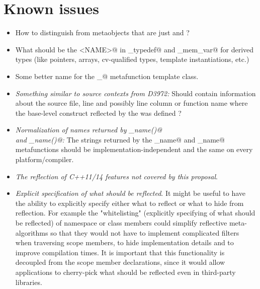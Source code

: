 \section{Known issues}

\begin{itemize}
\item How to distinguish  from metaobjects that
are just  and  ?

\item What should be the \verb@<NAME>@ in \verb@named_typedef@ and
\verb@named_mem_var@ for derived types (like pointers, arrays, cv-qualified types,
template instantiations, etc.)

\item Some better name for the \verb@template_@ metafunction template class.

\item {\em Something similar to source contexts from D3972:}
Should  contain information about the source file,
line and possibly line column or function name where the base-level construct
reflected by the  was defined ?

\item {\em Normalization of names returned by \verb@MetaNamed@ \verb@base_name()@\\
and \verb@MetaNamedScoped@ \verb@full_name()@:}
The strings returned by the \verb@base_name@ and \verb@full_name@ metafunctions
should be implementation-independent and the same on every platform/compiler.

\item {\em The reflection of C++11/14 features not covered by this proposal}.

\item {\em Explicit specification of what should be reflected}. It might be useful to have
the ability to explicitly specify either what to reflect or what to hide from reflection.
For example the "whitelisting" (explicitly specifying of what should be reflected) of namespace
or class members could simplify reflective meta-algorithms so that they would not have
to implement complicated filters when traversing scope members, to hide implementation details and
to improve compilation times. It is important that this functionality is decoupled from the
scope member declarations, since it would allow applications to cherry-pick what should be
reflected even in third-party libraries.

\end{itemize}
